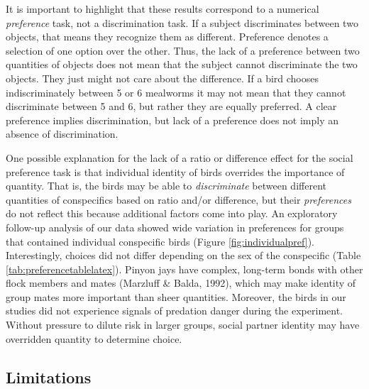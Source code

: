 \documentclass[
  ,pub,floatsintext]{apa6}
\begin{document}
It is important to highlight that these results correspond to a numerical \emph{preference} task, not a discrimination task. If a subject discriminates between two objects, that means they recognize them as different. Preference denotes a selection of one option over the other. Thus, the lack of a preference between two quantities of objects does not mean that the subject cannot discriminate the two objects. They just might not care about the difference. If a bird chooses indiscriminately between 5 or 6 mealworms it may not mean that they cannot discriminate between 5 and 6, but rather they are equally preferred. A clear preference implies discrimination, but lack of a preference does not imply an absence of discrimination.

One possible explanation for the lack of a ratio or difference effect for the social preference task is that individual identity of birds overrides the importance of quantity. That is, the birds may be able to \emph{discriminate} between different quantities of conspecifics based on ratio and/or difference, but their \emph{preferences} do not reflect this because additional factors come into play. An exploratory follow-up analysis of our data showed wide variation in preferences for groups that contained individual conspecific birds (Figure \ref{fig:individualpref}). Interestingly, choices did not differ depending on the sex of the conspecific (Table \ref{tab:preferencetablelatex}). Pinyon jays have complex, long-term bonds with other flock members and mates (Marzluff \& Balda, 1992), which may make identity of group mates more important than sheer quantities. Moreover, the birds in our studies did not experience signals of predation danger during the experiment. Without pressure to dilute risk in larger groups, social partner identity may have overridden quantity to determine choice.

\hypertarget{limitations}{%
\subsection{Limitations}\label{limitations}}
\end{document}
